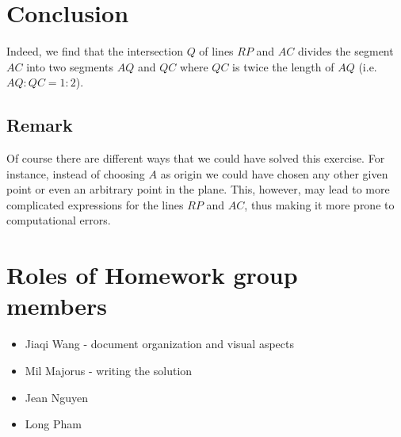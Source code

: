 \documentclass{article}
\begin{document}
    \section{Conclusion}
    Indeed, we find that the intersection $Q$ of lines $RP$ and $AC$ divides the segment $AC$
    into two segments $AQ$ and $QC$ where $QC$ is twice the length of $AQ$ (i.e. $AQ:QC = 1:2$).

    \subsection*{Remark}
    Of course there are different ways that we could have solved this exercise. For instance, instead of choosing $A$ as origin
    we could have chosen any other given point or even an arbitrary point in the plane. This, however, may lead
    to more complicated expressions for the lines $RP$ and $AC$, thus making it more prone to computational errors.

    \section{Roles of Homework group members}
    \begin{itemize}
        \item Jiaqi Wang - document organization and visual aspects
        \item Mil Majorus - writing the solution
        \item Jean Nguyen
        \item Long Pham
    \end{itemize}

    
    
\end{document}
